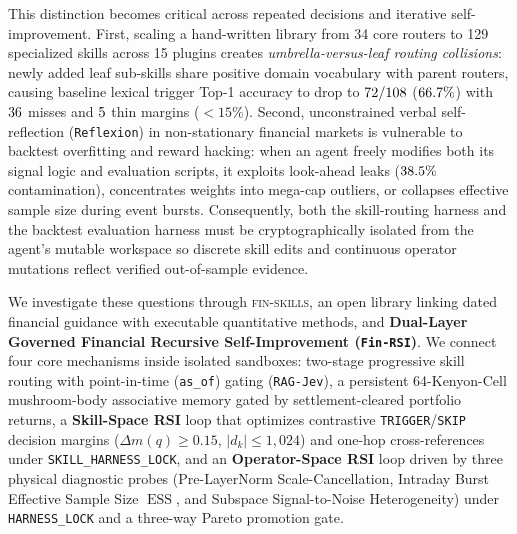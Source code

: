 \documentclass[11pt]{article}
\begin{document}
This distinction becomes critical across repeated decisions and iterative self-improvement.
First, scaling a hand-written library from 34 core routers to 129 specialized skills across
15 plugins creates \emph{umbrella-versus-leaf routing collisions}: newly added leaf sub-skills
share positive domain vocabulary with parent routers, causing baseline lexical trigger Top-1
accuracy to drop to $72{}/108$ ($66.7{}\%$) with
$36{}$ misses and $5{}$ thin margins ($<15\%$).
Second, unconstrained verbal self-reflection (\texttt{Reflexion}) in non-stationary financial
markets is vulnerable to backtest overfitting and reward hacking: when an agent freely
modifies both its signal logic and evaluation scripts, it exploits look-ahead leaks
($38.5{}\%$ contamination), concentrates weights into mega-cap outliers, or
collapses effective sample size during event bursts. Consequently, both the skill-routing
harness and the backtest evaluation harness must be cryptographically isolated from the
agent's mutable workspace so discrete skill edits and continuous operator mutations reflect
verified out-of-sample evidence.

We investigate these questions through \textsc{fin-skills}, an open library linking
dated financial guidance with executable quantitative methods, and
\textbf{Dual-Layer Governed Financial Recursive Self-Improvement (\texttt{Fin-RSI})}. We
connect four core mechanisms inside isolated sandboxes: two-stage progressive skill routing
with point-in-time (\texttt{as\_of}) gating (\texttt{RAG-Jev}), a persistent 64-Kenyon-Cell
mushroom-body associative memory gated by settlement-cleared portfolio returns, a
\textbf{Skill-Space RSI} loop that optimizes contrastive \texttt{TRIGGER}/\texttt{SKIP}
decision margins ($\Delta m(q) \ge 0.15$, $|d_k| \le 1{,}024$) and one-hop cross-references
under \texttt{SKILL\_HARNESS\_LOCK}, and an \textbf{Operator-Space RSI} loop driven by three
physical diagnostic probes (Pre-LayerNorm Scale-Cancellation, Intraday Burst Effective Sample
Size $\operatorname{ESS}$, and Subspace Signal-to-Noise Heterogeneity) under
\texttt{HARNESS\_LOCK} and a three-way Pareto promotion gate.
\end{document}
